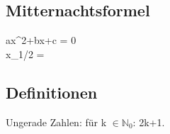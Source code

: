 {{\subsection*{Mitternachtsformel}
ax^2+bx+c = 0\\
x_{1/2} = 

\subsection*{Definitionen}
Ungerade Zahlen: für k $\in \mathbb{N}_0$: 2k+1.\\
}}